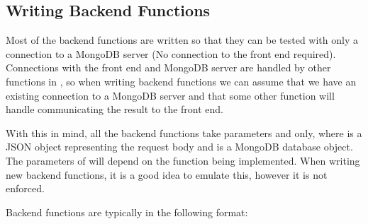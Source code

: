 \documentclass[letterpaper,10pt,english]{sphinxmanual}
\let\oldsubsection\subsection
\renewcommand{\subsection}{\needspace{6\baselineskip}\oldsubsection}
\begin{document}
\subsection{Writing Back\sphinxhyphen{}end Functions}
\label{\detokenize{docs/Expansion/api-expansion:writing-back-end-functions}}
Most of the back\sphinxhyphen{}end functions are written so that they can be tested
with only a connection to a MongoDB server (No connection to the front
end required). Connections with the front end and MongoDB server are
handled by other functions in , so when writing
back\sphinxhyphen{}end functions we can assume that we have an existing connection to
a MongoDB server and that some other function will handle communicating
the result to the front end.

With this in mind, all the back\sphinxhyphen{}end functions take parameters 
and  only, where  is a JSON object representing the
request body and  is a MongoDB database object. The parameters of
 will depend on the function being implemented. When writing new
back\sphinxhyphen{}end functions, it is a good idea to emulate this, however it is not
enforced.

Back\sphinxhyphen{}end functions are typically in the following format:
\end{document}
